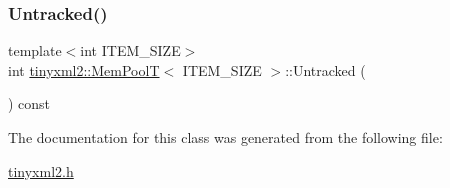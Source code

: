 \mbox{\label{classtinyxml2_1_1_mem_pool_t_a3bcdc302ae15d2810e11192321a8f5f1}} 
\subsubsection{\texorpdfstring{Untracked()}{Untracked()}}
{\footnotesize\ttfamily template$<$int I\+T\+E\+M\+\_\+\+S\+I\+ZE$>$ \\
int \hyperlink{classtinyxml2_1_1_mem_pool_t}{tinyxml2\+::\+Mem\+PoolT}$<$ I\+T\+E\+M\+\_\+\+S\+I\+ZE $>$\+::Untracked (\begin{DoxyParamCaption}{ }\end{DoxyParamCaption}) const\hspace{0.3cm}{\ttfamily [inline]}}



The documentation for this class was generated from the following file\+:\begin{DoxyCompactItemize}
\item 
\hyperlink{tinyxml2_8h}{tinyxml2.\+h}\end{DoxyCompactItemize}
